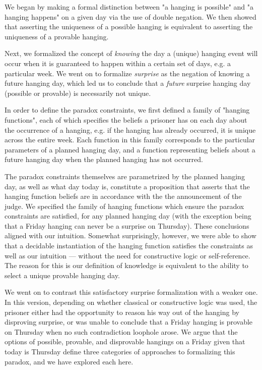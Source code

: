 \documentclass[runningheads]{llncs}
\begin{document}
We began by making a formal distinction between "a hanging is possible" and "a hanging
happens" on a given day via the use of double negation. We then showed that
asserting the uniqueness of a possible hanging is equivalent to asserting the uniqueness of a provable hanging.

Next, we formalized the concept of \emph{knowing} the day a (unique) hanging event will occur
when it is guaranteed to happen within a certain set of days, e.g. a particular week.
We went on to formalize \emph{surprise} as the negation of
knowing a future hanging day, which led us to conclude that a \emph{future} surprise
hanging day (possible or provable) is necessarily not unique.

In order to define the paradox constraints, we first defined a family of "hanging functions",
each of which specifies the beliefs a prisoner has on each day about the occurrence
of a hanging, e.g. if the hanging has already occurred, it is
unique across the entire week. Each function in this family corresponds to
the particular parameters of
a planned hanging day, and a function representing beliefs about a future
hanging day when the planned hanging has not occurred.

The paradox constraints themselves are parametrized by the planned hanging day, as
well as what day today is, constitute a proposition that asserts that
the hanging function beliefs are in accordance with the the announcement of the judge.
We specified the family of hanging functions which ensure the paradox constraints
are satisfied, for any planned hanging day (with the exception being that a Friday
hanging can never be a surprise on Thursday). These conclusions aligned with our
intuition. Somewhat surprisingly, however, we were able to show that a decidable
instantiation of the hanging function satisfies the constraints as well as
our intuition --- without the need for constructive logic or self-reference.
The reason for this is our definition of knowledge is equivalent to the ability to select a
unique provable hanging day.

We went on to contrast this satisfactory surprise formalization with a weaker one.
In this version, depending on whether classical or constructive logic was used,
the prisoner either had the opportunity to reason his way out of the
hanging by disproving surprise, or was unable to conclude that a Friday hanging is provable on Thursday
when no such contradiction loophole arose. We argue that the options of possible,
provable, and disprovable hangings on a Friday given that today is Thursday define three categories of
approaches to formalizing this paradox, and we have explored each here.
\end{document}
